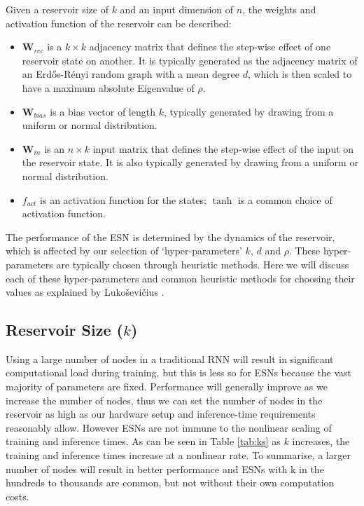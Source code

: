 \documentclass[a4paper,12pt]{article}
\begin{document}
Given a reservoir size of $k$ and an input dimension of $n$, the weights and activation function of the reservoir can be described:

\begin{itemize}
\item $\mathbf{W}_{rec}$ is a $k \times k$ adjacency matrix that defines the step-wise effect of one reservoir state on another. It is typically generated as the adjacency matrix of an Erd\H os-R\'enyi random graph with a mean degree $d$, which is then scaled to have a maximum absolute Eigenvalue of $\rho$.
\item $\mathbf{W}_{bias}$ is a bias vector of length $k$, typically generated by drawing from a uniform or normal distribution.
\item $\mathbf{W}_{in}$ is an $n \times k$ input matrix that defines the step-wise effect of the input on the reservoir state. It is also typically generated by drawing from a uniform or normal distribution.
\item $f_{act}$ is an activation function for the states; $\tanh$ is a common choice of activation function.
\end{itemize}

The performance of the ESN is determined by the dynamics of the reservoir, which is affected by our selection of `hyper-parameters' $k$, $d$ and $\rho$. These hyper-parameters are typically chosen through heuristic methods. Here we will discuss each of these hyper-parameters and common heuristic methods for choosing their values as explained by Luko{\v{s}}evi{\v{c}}ius \cite{lukosevicius2012practical}.



\subsection*{Reservoir Size ($k$)}

Using a large number of nodes in a traditional RNN will result in significant computational load during training, but this is less so for ESNs because the vast majority of parameters are fixed. Performance will generally improve as we increase the number of nodes, thus we can set the number of nodes in the reservoir as high as our hardware setup and inference-time requirements reasonably allow. However ESNs are not immune to the nonlinear scaling of training and inference times. As can be seen in Table \ref{tab:ks} as $k$ increases, the training and inference times increase at a nonlinear rate. To summarise, a larger number of nodes will result in better performance and ESNs with k in the hundreds to thousands are common, but not without their own computation costs.
\end{document}
